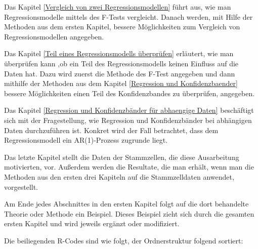\documentclass[12pt,a4paper]{article}
\theoremstyle{definition}
\theoremstyle{definition}
\theoremstyle{definition}
\begin{document}
Das Kapitel \ref{Vergleich von zwei Regressionsmodellen} führt aus, wie man Regressionsmodelle mittels des F-Tests vergleicht. Danach werden, mit Hilfe der Methoden aus dem ersten Kapitel, bessere Möglichkeiten zum Vergleich von Regressionsmodellen angegeben.

Das Kapitel \ref{Teil eines Regressionsmodells überprüfen} erläutert, wie man überprüfen kann ,ob ein Teil des Regressionsmodells keinen Einfluss auf die Daten hat. Dazu wird zuerst die Methode des F-Test angegeben und dann mithilfe der Methoden aus dem Kapitel \ref{Regression und Konfidenzbaender} bessere Möglichkeiten einen Teil des Konfidenzbandes zu überprüfen, angegeben.

Das Kapitel \ref{Regression und Konfidenzbänder für abhaengige Daten} beschäftigt sich mit der Fragestellung, wie Regression und Konfidenzbänder bei abhängigen Daten durchzuführen ist. Konkret wird der Fall betrachtet, dass dem Regressionsmodell ein AR(1)-Prozess zugrunde liegt.

Das letzte Kapitel stellt die Daten der Stammzellen, die diese Ausarbeitung motivierten, vor. Außerdem werden die Resultate, die man erhält, wenn man die Methoden aus den ersten drei Kapiteln auf die Stammzelldaten anwendet, vorgestellt.

Am Ende jedes Abschnittes in den ersten Kapitel folgt auf die dort behandelte Theorie oder Methode ein Beispiel. Dieses Beispiel zieht sich durch die gesamten ersten Kapitel und wird jeweils ergänzt oder modifiziert.

Die beiliegenden R-Codes sind wie folgt, der Ordnerstruktur folgend sortiert:
\end{document}
